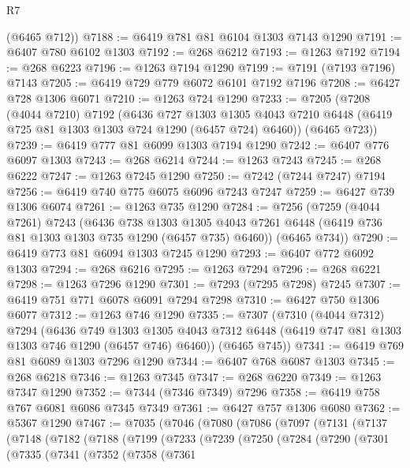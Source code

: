 \begin{lexlean}{R7}
\begin{coremodule}
      (@6465 @712))
@7188 := @6419 @781 @81 @6104 @1303 @7143 @1290
@7191 := @6407 @780 @6102 @1303
@7192 := @268 @6212
@7193 := @1263 @7192
@7194 := @268 @6223
@7196 := @1263 @7194 @1290
@7199 := @7191 (@7193 @7196) @7143
@7205 := @6419 @729 @779 @6072 @6101 @7192 @7196
@7208 := @6427 @728 @1306 @6071
@7210 := @1263 @724 @1290
@7233 := @7205
    (@7208
      (@4044 @7210)
      @7192
      (@6436
        @727
        @1303
        @1305
        @4043
        @7210
        @6448
        (@6419 @725 @81 @1303 @1303 @724 @1290 (@6457 @724) @6460))
      (@6465 @723))
@7239 := @6419 @777 @81 @6099 @1303 @7194 @1290
@7242 := @6407 @776 @6097 @1303
@7243 := @268 @6214
@7244 := @1263 @7243
@7245 := @268 @6222
@7247 := @1263 @7245 @1290
@7250 := @7242 (@7244 @7247) @7194
@7256 := @6419 @740 @775 @6075 @6096 @7243 @7247
@7259 := @6427 @739 @1306 @6074
@7261 := @1263 @735 @1290
@7284 := @7256
    (@7259
      (@4044 @7261)
      @7243
      (@6436
        @738
        @1303
        @1305
        @4043
        @7261
        @6448
        (@6419 @736 @81 @1303 @1303 @735 @1290 (@6457 @735) @6460))
      (@6465 @734))
@7290 := @6419 @773 @81 @6094 @1303 @7245 @1290
@7293 := @6407 @772 @6092 @1303
@7294 := @268 @6216
@7295 := @1263 @7294
@7296 := @268 @6221
@7298 := @1263 @7296 @1290
@7301 := @7293 (@7295 @7298) @7245
@7307 := @6419 @751 @771 @6078 @6091 @7294 @7298
@7310 := @6427 @750 @1306 @6077
@7312 := @1263 @746 @1290
@7335 := @7307
    (@7310
      (@4044 @7312)
      @7294
      (@6436
        @749
        @1303
        @1305
        @4043
        @7312
        @6448
        (@6419 @747 @81 @1303 @1303 @746 @1290 (@6457 @746) @6460))
      (@6465 @745))
@7341 := @6419 @769 @81 @6089 @1303 @7296 @1290
@7344 := @6407 @768 @6087 @1303
@7345 := @268 @6218
@7346 := @1263 @7345
@7347 := @268 @6220
@7349 := @1263 @7347 @1290
@7352 := @7344 (@7346 @7349) @7296
@7358 := @6419 @758 @767 @6081 @6086 @7345 @7349
@7361 := @6427 @757 @1306 @6080
@7362 := @5367 @1290
@7467 := @7035
    (@7046
      (@7080
        (@7086
          (@7097
            (@7131
              (@7137
                (@7148
                  (@7182
                    (@7188
                      (@7199
                        (@7233
                          (@7239
                            (@7250
                              (@7284
                                (@7290
                                  (@7301
                                    (@7335
                                      (@7341
                                        (@7352
                                          (@7358
                                            (@7361

\end{coremodule}
\end{lexlean}
